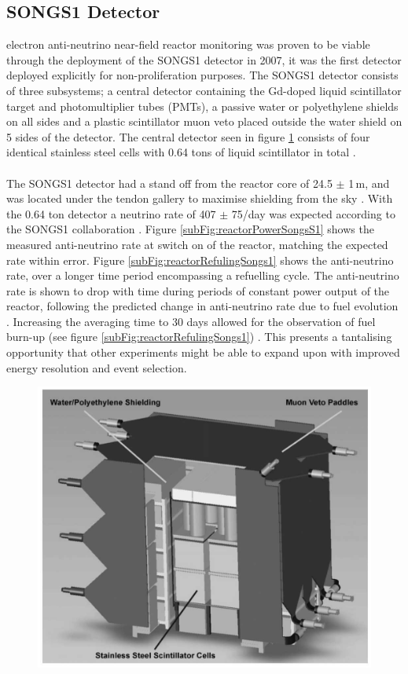 \subsection{SONGS1 Detector}
electron anti-neutrino near-field reactor monitoring was proven to be viable through the deployment of the SONGS1 detector in 2007\cite{Bowden_2007}, it was the first detector deployed explicitly for non-proliferation purposes. The SONGS1 detector consists of three subsystems; a central detector containing the Gd-doped liquid scintillator target and photomultiplier tubes (PMTs), a passive water or polyethylene shields on all sides and a plastic scintillator muon veto placed outside the water shield on 5 sides of the detector. The central detector seen in figure \ref{fig:SongsS1Detector} consists of four identical stainless steel cells with 0.64 tons of liquid scintillator in total \cite{Bowden_2007}. 
\\\\The SONGS1 detector had a stand off from the reactor core of 24.5 $\pm$ 1\,m, and was located under the tendon gallery to maximise shielding from the sky \cite{Bowden_2007}. With the 0.64 ton detector a neutrino rate of 407 $\pm$ 75/day was expected according to the SONGS1 collaboration \cite{Bowden_2007}. Figure \ref{subFig:reactorPowerSongsS1} shows the measured anti-neutrino rate at switch on of the reactor, matching the expected rate within error. Figure \ref{subFig:reactorRefulingSongs1} shows the anti-neutrino rate, over a longer time period encompassing a refuelling cycle. The anti-neutrino rate is shown to drop with time during periods of constant power output of the reactor, following the predicted change in anti-neutrino rate due to fuel evolution \cite{Bowden_2008}. Increasing the averaging time to 30 days allowed for the observation of fuel burn-up (see figure \ref{subFig:reactorRefulingSongs1}) \cite{Bowden_2008}. This presents a tantalising opportunity that other experiments might be able to expand upon with improved energy resolution and event selection. %

\begin{figure}[!h]
 \centering
 \includegraphics[width=0.5\linewidth]{Chapter1/Figs/SongsS1Detector.jpg}
 \label{fig:SongsS1Detector}
\end{figure}

